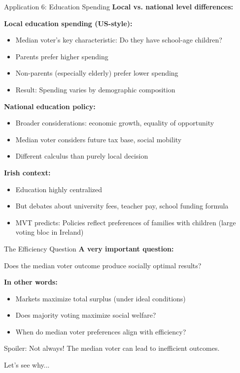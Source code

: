 \documentclass[10pt]{beamer}
\begin{document}
\begin{frame}[allowframebreaks]{Application 6: Education Spending}
\textbf{Local vs. national level differences:}


\textbf{Local education spending (US-style):}
\begin{itemize}
\item Median voter's key characteristic: \alert{Do they have school-age children?}
\item Parents prefer higher spending
\item Non-parents (especially elderly) prefer lower spending
\item Result: Spending varies by demographic composition
\end{itemize}



\textbf{National education policy:}
\begin{itemize}
\item Broader considerations: economic growth, equality of opportunity
\item Median voter considers future tax base, social mobility
\item Different calculus than purely local decision
\end{itemize}

  \framebreak  

\textbf{Irish context:}
\begin{itemize}
\item Education highly centralized
\item But debates about university fees, teacher pay, school funding formula
\item \alert{MVT predicts:} Policies reflect preferences of families with children (large voting bloc in Ireland)
\end{itemize}
\end{frame}

\begin{frame}{The Efficiency Question}
\textbf{A very important question:}


\begin{center}
\Large Does the median voter outcome produce \alert{socially optimal} results?
\end{center}




\textbf{In other words:}
\begin{itemize}
\item Markets maximize total surplus (under ideal conditions)
\item Does majority voting maximize social welfare?
\item When do median voter preferences align with efficiency?
\end{itemize}




\alert{Spoiler:} Not always! The median voter can lead to inefficient outcomes.



Let's see why...
\end{frame}
\end{document}
